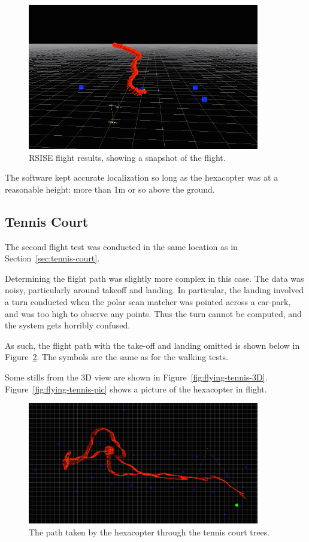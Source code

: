 \documentclass[12pt,oneside,a4paper]{book}
\begin{document}
\begin{figure}
  \centering
  \includegraphics[width=0.9\textwidth]{figs/rsise-flying-results}
  \caption{RSISE flight results, showing a snapshot of the
    flight.}
  \label{fig:rsise-results}
\end{figure}

The software kept accurate localization so long as the hexacopter was
at a reasonable height: more than 1m or so above the ground.

\newpage
\subsection{Tennis Court}
\label{sec:tennis-court-1}

The second flight test was conducted in the same location as in
Section~\ref{sec:tennis-court}. 

Determining the flight path was slightly more complex in this
case. The data was noisy, particularly around takeoff and landing. In
particular, the landing involved a turn conducted when the polar scan
matcher was pointed across a car-park, and was too high to observe any
points. Thus the turn cannot be computed, and the system gets horribly
confused.

As such, the flight path with the take-off and landing omitted is
shown below in Figure~\ref{fig:flying-tennis-path}. The symbols are
the same as for the walking tests.

Some stills from the 3D view are shown in
Figure~\ref{fig:flying-tennis-3D}. Figure~\ref{fig:flying-tennis-pic}
shows a picture of the hexacopter in flight.

\begin{figure}[h]
  \centering
  \includegraphics[width=0.9\textwidth]{figs/tennis-flying-results}
  \caption{The path taken by the hexacopter through the tennis court
    trees.}
  \label{fig:flying-tennis-path}
\end{figure}
\end{document}
